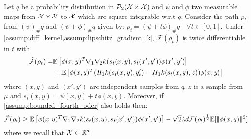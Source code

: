 \begin{lemma}\label{lem:second_derivative_augmented_mmd}
Let $q$ be a probability distribution in $\mathcal{P}_2({{\mathcal X}} \times {{\mathcal X}})$ and $\psi$ and $\phi$ two measurable maps from  ${{\mathcal X}} \times{{\mathcal X}} $ to ${{\mathcal X}}$  which are square-integrable w.r.t $q$. Consider the path $\rho_t$ from  $(\psi)_{\#}q$ and $(\psi+\phi)_{\#}q$ given by: $\rho_t=  (\psi+t\phi)_{\#}q \quad \forall t\in [0,1]$. Under \cref{assump:diff_kernel,assump:lipschitz_gradient_k}, $\mathcal{F}(\rho_t)$ is twice differentiable in $t$ with
	\begin{align*}
		\ddot{{{\mathcal F}}}(\rho_t)=&\mathbb{E}\left[\phi(x,y)^T\nabla_1 \nabla_2 k(s_t(x,y),s_t(x',y')) \phi(x',y')\right] \\
		&+ \mathbb{E}\left[\phi(x,y)^T (H_1k(s_t(x,y),y_t')-H_1k(s_t(x,y),z)) \phi(x,y)\right]
	\end{align*}
where $(x,y)$ and $(x',y')$ are independent samples from $q$, $z$ is a sample from $\mu$ and  $s_t(x,y)= \psi(x,y)+t\phi(x,y)$.
Moreover, if \cref{assump:bounded_fourth_oder} also holds then:
\begin{align*}
		\ddot{{{\mathcal F}}}(\rho_t) \geq \mathbb{E}\left[\phi(x,y)^T\nabla_1 \nabla_2 k(s_t(x,y),s_t(x',y')) \phi(x',y')\right] - \sqrt{2}\lambda d {{\mathcal F}}(\rho_t)^{\frac{1}{2}}\mathbb{E}[\Vert \phi(x,y) \Vert^2]  
\end{align*}
where we recall that ${{\mathcal X}}\subset \mathbb{R}^d$.
\end{lemma}
